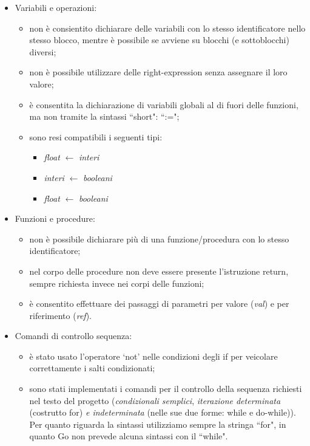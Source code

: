 \documentclass[12pt]{article}
\begin{document}
\begin{itemize}
\item Variabili e operazioni:
	\begin{itemize}
		\item non è consientito dichiarare delle variabili con lo stesso identificatore nello stesso blocco, mentre è possibile se avviene su blocchi (e sottoblocchi) diversi;
		\item non è possibile utilizzare delle right-expression senza assegnare il loro valore;
		\item è consentita la dichiarazione di variabili globali al di fuori delle funzioni, ma non tramite la sintassi ``short": ``:=";
		\item sono resi compatibili i seguenti tipi:
		\begin{itemize}
			\item \textit{float} $\leftarrow$ \textit{interi}
			\item \textit{interi} $\leftarrow$ \textit{booleani}
			\item \textit{float} $\leftarrow$ \textit{booleani}
		\end{itemize}
	\end{itemize}
\item Funzioni e procedure:
	\begin{itemize}
		\item non è possibile dichiarare più di una funzione/procedura con lo stesso identificatore;
		\item nel corpo delle procedure non deve essere presente l'istruzione return, sempre richiesta invece nei corpi delle funzioni;
		\item è consentito effettuare dei passaggi di parametri per valore (\textit{val}) e per riferimento (\textit{ref}).
	\end{itemize}
\item Comandi di controllo sequenza:
	\begin{itemize}
		\item è stato usato l'operatore `not' nelle condizioni degli if per veicolare correttamente i salti condizionati;
		\item sono stati implementati i comandi per il controllo della sequenza richiesti nel testo del progetto (\textit{condizionali semplici}, \textit{iterazione determinata} (costrutto for) \textit{e indeterminata} (nelle sue due forme:  while e do-while)). Per quanto riguarda la sintassi utilizziamo sempre la stringa ``for", in quanto Go non prevede alcuna sintassi con il ``while".\\

\end{itemize}
\end{itemize}
\end{document}
